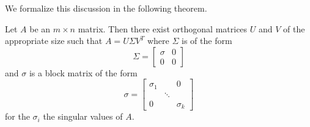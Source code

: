 \documentclass{ximera}
\begin{document}
We formalize this discussion in the following theorem.
 
\begin{theorem}\label{th:singvaldecomp}
Let $A$ be an $m\times n$ matrix. Then there exist
orthogonal matrices $U$ and $V$ of the appropriate size such that $A= U \Sigma V^T$ where $\Sigma$ is of the form
\[
\Sigma =
\left[
\begin{array}{cc}
\sigma & 0 \\
0 & 0
\end{array}
\right]
\]
and $\sigma $ is a block matrix of the form
\[
\sigma =\left[
\begin{array}{ccc}
\sigma _{1} &  & 0 \\
& \ddots &  \\
0 &  & \sigma _{k}
\end{array}
\right]
\]
for the $\sigma _{i}$ the singular values of $A.$
\end{theorem}
 
\end{document}
